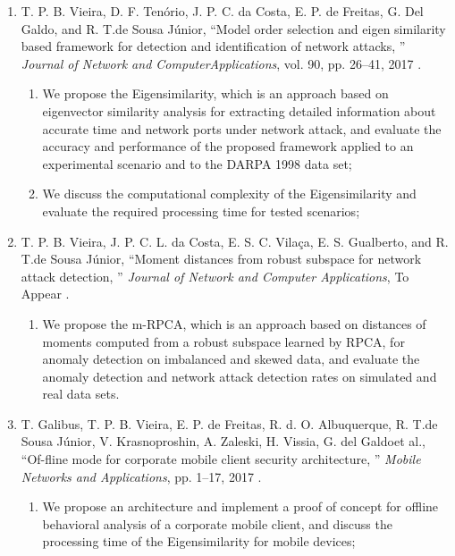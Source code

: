 \begin{enumerate}[label*=\arabic*.]
	\item T. P. B. Vieira, D. F. Tenório, J. P. C. da Costa, E. P. de Freitas, G. Del Galdo, and R. T.de Sousa Júnior, “Model order selection and eigen similarity based framework for detection and identification of network attacks, ” \textit{Journal of Network and ComputerApplications}, vol. 90, pp. 26–41, 2017 .
	\begin{enumerate}[label*=\arabic*.]
		\item We propose the Eigensimilarity, which is an approach based on eigenvector similarity analysis for extracting detailed information about accurate time and network ports under network attack, and evaluate the accuracy and performance of the proposed framework applied to an experimental scenario and to the DARPA 1998 data set;
		\item We discuss the computational complexity of the Eigensimilarity and evaluate the required processing time for tested scenarios;
	\end{enumerate}
	\item T. P. B. Vieira, J. P. C. L. da Costa, E. S. C. Vilaça, E. S. Gualberto, and R. T.de Sousa Júnior, “Moment distances from robust subspace for network attack detection, ” \textit{Journal of Network and Computer Applications}, To Appear .
	\begin{enumerate}[label*=\arabic*.]
		\item We propose the m-RPCA, which is an approach based on distances of moments computed from a robust subspace learned by RPCA, for anomaly detection on imbalanced and skewed data, and evaluate the anomaly detection and network attack detection rates on simulated and real data sets.
	\end{enumerate}
	\item T. Galibus, T. P. B. Vieira, E. P. de Freitas, R. d. O. Albuquerque, R. T.de Sousa Júnior, V. Krasnoproshin, A. Zaleski, H. Vissia, G. del Galdoet al., “Of-fline mode for corporate mobile client security architecture, ” \textit{Mobile Networks and Applications}, pp. 1–17, 2017 .
	\begin{enumerate}[label*=\arabic*.]
		\item We propose an architecture and implement a proof of concept for offline behavioral analysis of a corporate mobile client, and discuss the processing time of the Eigensimilarity for mobile devices;
	\end{enumerate}

\end{enumerate}

